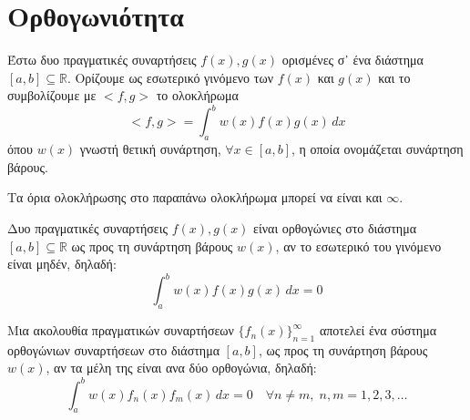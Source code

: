 \section{Ορθογωνιότητα}

\begin{dfn}
    Έστω δυο πραγματικές συναρτήσεις $ f(x), g(x) $ ορισμένες σ᾽ ένα διάστημα 
    $ [a,b] \subseteq \mathbb{R} $. Ορίζουμε ως \textcolor{Col1}{εσωτερικό γινόμενο} 
    των $ f(x) $ και $ g(x) $ και το συμβολίζουμε με $ <f,g> $ το ολοκλήρωμα
    \[
        <f,g> = \int _{a}^{b} w(x) f(x)g(x) \,{dx} 
    \] 
    όπου $ w(x) $ γνωστή θετική συνάρτηση, $ \forall x \in [a,b] $, η οποία 
    ονομάζεται \textcolor{Col1}{συνάρτηση βάρους}.
\end{dfn}

\begin{rem}
    Τα όρια ολοκλήρωσης στο παραπάνω ολοκλήρωμα μπορεί να είναι και $ \infty $.
\end{rem}

\begin{dfn}
    Δυο πραγματικές συναρτήσεις $ f(x), g(x) $ είναι \textcolor{Col1}{ορθογώνιες} 
    στο διάστημα $ [a,b] \subseteq \mathbb{R} $ ως προς τη συνάρτηση βάρους $ w(x) $, 
    αν το εσωτερικό του γινόμενο είναι μηδέν, δηλαδή:
    \[
        \int _{a}^{b} w(x)f(x)g(x) \,{dx} = 0
    \] 
\end{dfn}

\begin{dfn}
    Μια ακολουθία πραγματικών συναρτήσεων $ \{ f_{n}(x) \}_{n=1}^{\infty} $ αποτελεί 
    ένα σύστημα ορθογώνιων συναρτήσεων στο διάστημα $ [a,b] $, ως προς τη 
    συνάρτηση βάρους $ w(x) $, αν τα μέλη της είναι ανα δύο ορθογώνια, δηλαδή:
    \[
        \int _{a}^{b} w(x) f_{n}(x)f_{m}(x) \,{dx} = 0 \quad \forall n \neq m, \; n,m = 
        1,2,3, \ldots
    \] 
\end{dfn}


